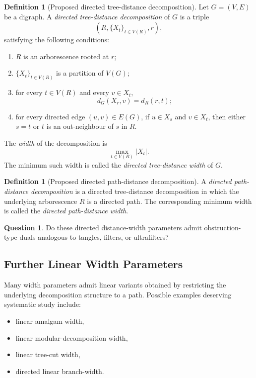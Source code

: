 \documentclass[10pt]{book}
\theoremstyle{definition}
\newtheorem{definition}[theorem]{Definition}
\newtheorem{question}[theorem]{Question}
\begin{document}
\begin{definition}[Proposed directed tree-distance decomposition]
Let \(G=(V,E)\) be a digraph.
A \emph{directed tree-distance decomposition} of \(G\) is a triple
\[
(R,\{X_t\}_{t\in V(R)},r),
\]
satisfying the following conditions:
\begin{enumerate}
    \item \(R\) is an arborescence rooted at \(r\);
    \item \(\{X_t\}_{t\in V(R)}\) is a partition of \(V(G)\);
    \item for every \(t\in V(R)\) and every \(v\in X_t\),
    \[
    d_G(X_r,v)=d_R(r,t);
    \]
    \item for every directed edge \((u,v)\in E(G)\), if \(u\in X_s\) and \(v\in X_t\), then either \(s=t\) or \(t\) is an out-neighbour of \(s\) in \(R\).
\end{enumerate}
The \emph{width} of the decomposition is
\[
\max_{t\in V(R)} |X_t|.
\]
The minimum such width is called the \emph{directed tree-distance width} of \(G\).
\end{definition}

\begin{definition}[Proposed directed path-distance decomposition]
A \emph{directed path-distance decomposition} is a directed tree-distance decomposition in which the underlying arborescence \(R\) is a directed path.
The corresponding minimum width is called the \emph{directed path-distance width}.
\end{definition}

\begin{question}
Do these directed distance-width parameters admit obstruction-type duals analogous to tangles, filters, or ultrafilters?
\end{question}

\subsection{Further Linear Width Parameters}

Many width parameters admit linear variants obtained by restricting the underlying decomposition structure to a path.
Possible examples deserving systematic study include:
\begin{itemize}
    \item linear amalgam width,
    \item linear modular-decomposition width,
    \item linear tree-cut width,
    \item directed linear branch-width.
\end{itemize}
\end{document}
